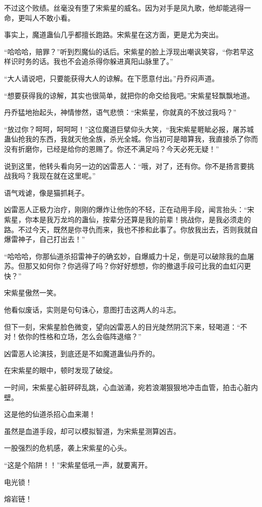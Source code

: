 \begin{this_body}
不过这个败绩。丝毫没有堕了宋紫星的威名。因为对手是凤九歌，他却能逃得一命，更叫人不敢小看。

事实上，魔道蛊仙几乎都擅长跑路。宋紫星在这方面，更是尤为突出。

“哈哈哈，赔罪？”听到烈魔仙的话后。宋紫星的脸上浮现出嘲讽笑容，“你若早这样识时务的话。我也不会追杀得你躲进真阳山脉里了。”

“大人请说吧，只要能获得大人的谅解。在下愿意付出。”丹乔闷声道。

“想要获得我的谅解，其实也很简单，就把你的命交给我吧。”宋紫星轻飘飘地道。

丹乔猛地抬起头，神情惨然，语气悲愤：“宋紫星，你就真的不放过我吗？”

“放过你？呵呵，呵呵呵！”这位魔道巨擘仰头大笑，“我宋紫星睚眦必报，屠苏城蛊仙抢我的东西，我就灭他全族，杀光全城。你当初可是暗算我，我直接杀了你而没有折磨你，已经是给你的恩赐了。你还不满足吗？今天必死无疑！”

说到这里，他转头看向另一边的凶雷恶人：“哦，对了，还有你。你不是扬言要挑战我吗？我现在就在这里呢。”

语气戏谑，像是猫抓耗子。

凶雷恶人正极力治疗，刚刚的爆炸让他伤的不轻，正在动用手段，闻言抬头：“宋紫星，你本是我万龙坞的蛊仙，按辈分还算是我的前辈！挑战你，是我必须走的路。不过今天，既然是你寻仇而来，我也不掺和此事了。你放我出去，否则我就自爆雷神子，自己打出去！”

“哈哈哈，你那仙道杀招雷神子的确玄妙，自爆威力十足，倒是可以破除我的血屠苏。但那又如何你？你逃得了吗？你好好想想，你的撤退手段可比我的血虹闪更快？”

宋紫星傲然一笑。

他看似废话，实则是句句诛心，意图打击这两人的斗志。

但下一刻，宋紫星脸色微变，望向凶雷恶人的目光陡然阴沉下来，轻喝道：“不对！依你的性格和立场，怎么会临阵退缩？”

凶雷恶人论演技，到底还是不如魔道蛊仙丹乔的。

在宋紫星的眼中，顿时发现了破绽。

一时间，宋紫星心脏砰砰乱跳，心血汹涌，宛若浪潮狠狠地冲击血管，拍击心脏内壁。

这是他的仙道杀招心血来潮！

虽然是血道手段，却可以模拟智道，为宋紫星测算凶吉。

一股强烈的危机感，袭上宋紫星的心头。

“这是个陷阱！！”宋紫星低吼一声，就要离开。

电光锁！

熔岩链！


\end{this_body}
